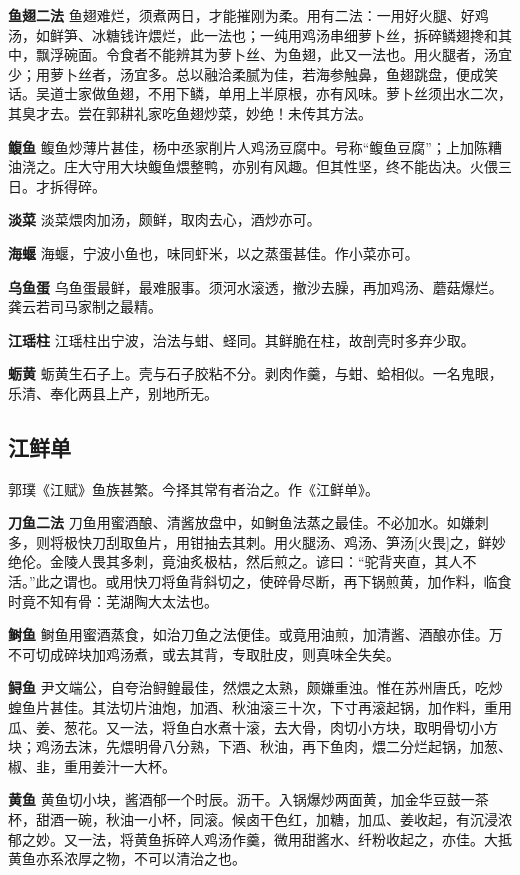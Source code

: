 \documentclass[]{article}
\begin{document}
\textbf{鱼翅二法}
鱼翅难烂，须煮两日，才能摧刚为柔。用有二法：一用好火腿、好鸡汤，如鲜笋、冰糖钱许煨烂，此一法也；一纯用鸡汤串细萝卜丝，拆碎鳞翅搀和其中，飘浮碗面。令食者不能辨其为萝卜丝、为鱼翅，此又一法也。用火腿者，汤宜少；用萝卜丝者，汤宜多。总以融洽柔腻为佳，若海参触鼻，鱼翅跳盘，便成笑话。吴道士家做鱼翅，不用下鳞，单用上半原根，亦有风味。萝卜丝须出水二次，其臭才去。尝在郭耕礼家吃鱼翅炒菜，妙绝！未传其方法。

\textbf{鳆鱼}
鳆鱼炒薄片甚佳，杨中丞家削片人鸡汤豆腐中。号称``鳆鱼豆腐''；上加陈糟油浇之。庄大守用大块鳆鱼煨整鸭，亦别有风趣。但其性坚，终不能齿决。火偎三日。才拆得碎。

\textbf{淡菜} 淡菜煨肉加汤，颇鲜，取肉去心，酒炒亦可。

\textbf{海蝘} 海蝘，宁波小鱼也，味同虾米，以之蒸蛋甚佳。作小菜亦可。

\textbf{乌鱼蛋}
乌鱼蛋最鲜，最难服事。须河水滚透，撤沙去臊，再加鸡汤、蘑菇爆烂。龚云若司马家制之最精。

\textbf{江瑶柱}
江瑶柱出宁波，治法与蚶、蛏同。其鲜脆在柱，故剖壳时多弃少取。

\textbf{蛎黄}
蛎黄生石子上。壳与石子胶粘不分。剥肉作羹，与蚶、蛤相似。一名鬼眼，乐清、奉化两县上产，别地所无。

\hypertarget{header-n15}{%
\subsection{江鲜单}\label{header-n15}}

郭璞《江赋》鱼族甚繁。今择其常有者治之。作《江鲜单》。

\textbf{刀鱼二法}
刀鱼用蜜酒酿、清酱放盘中，如鲥鱼法蒸之最佳。不必加水。如嫌刺多，则将极快刀刮取鱼片，用钳抽去其刺。用火腿汤、鸡汤、笋汤{[}火畏{]}之，鲜妙绝伦。金陵人畏其多刺，竟油炙极枯，然后煎之。谚曰：``驼背夹直，其人不活。''此之谓也。或用快刀将鱼背斜切之，使碎骨尽断，再下锅煎黄，加作料，临食时竟不知有骨：芜湖陶大太法也。

\textbf{鲥鱼}
鲥鱼用蜜酒蒸食，如治刀鱼之法便佳。或竟用油煎，加清酱、酒酿亦佳。万不可切成碎块加鸡汤煮，或去其背，专取肚皮，则真味全失矣。

\textbf{鲟鱼}
尹文端公，自夸治鲟鳇最佳，然煨之太熟，颇嫌重浊。惟在苏州唐氏，吃炒蝗鱼片甚佳。其法切片油炮，加酒、秋油滚三十次，下寸再滚起锅，加作料，重用瓜、姜、葱花。又一法，将鱼白水煮十滚，去大骨，肉切小方块，取明骨切小方块；鸡汤去沫，先煨明骨八分熟，下酒、秋油，再下鱼肉，煨二分烂起锅，加葱、椒、韭，重用姜汁一大杯。

\textbf{黄鱼}
黄鱼切小块，酱酒郁一个时辰。沥干。入锅爆炒两面黄，加金华豆鼓一茶杯，甜酒一碗，秋油一小杯，同滚。候卤干色红，加糖，加瓜、姜收起，有沉浸浓郁之妙。又一法，将黄鱼拆碎人鸡汤作羹，微用甜酱水、纤粉收起之，亦佳。大抵黄鱼亦系浓厚之物，不可以清治之也。
\end{document}

